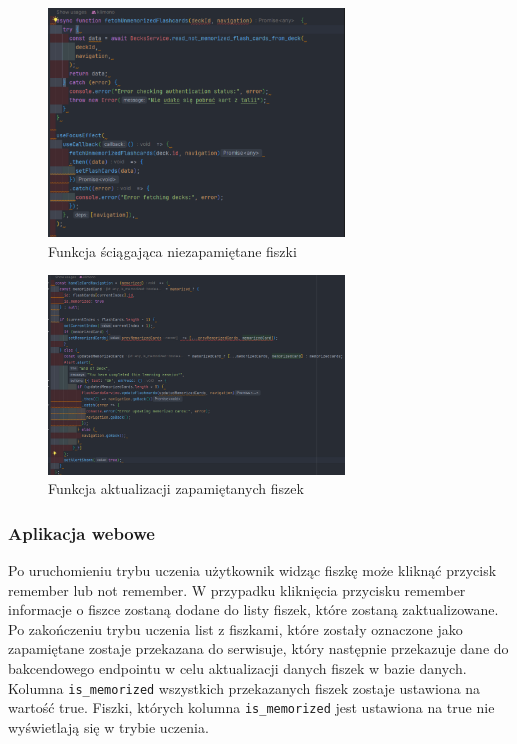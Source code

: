 \begin{figure}[H]
    \centering
    \includegraphics[width=0.7\textwidth]{chapters/chapter_8/screens/get_unmemorized_flash_cards_mobile}
    \caption{Funkcja ściągająca niezapamiętane fiszki}
    \label{img:get_unmemorized_flash_cards_mobile}
\end{figure}

\begin{figure}[H]
    \centering
    \includegraphics[width=0.7\textwidth]{chapters/chapter_8/screens/update_unmemorized_flash_cards_mobile}
    \caption{Funkcja aktualizacji zapamiętanych fiszek}
    \label{img:update_unmemorized_flash_cards_mobile}
\end{figure}

\subsubsection{Aplikacja webowe}

Po uruchomieniu trybu uczenia użytkownik widząc fiszkę może kliknąć przycisk remember lub not remember. W przypadku kliknięcia przycisku remember informacje o fiszce zostaną dodane do listy fiszek, które zostaną zaktualizowane. Po zakończeniu trybu uczenia list z fiszkami, które zostały oznaczone jako zapamiętane zostaje przekazana do serwisuje, który następnie przekazuje dane do bakcendowego endpointu w celu aktualizacji danych fiszek w bazie danych. Kolumna \texttt{is_memorized} wszystkich przekazanych fiszek zostaje ustawiona na wartość true. Fiszki, których kolumna \texttt{is_memorized} jest ustawiona na true nie wyświetlają się w trybie uczenia.

